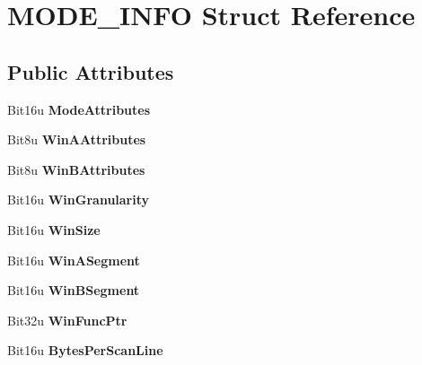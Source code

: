 \hypertarget{structMODE__INFO}{\section{M\-O\-D\-E\-\_\-\-I\-N\-F\-O Struct Reference}
\label{structMODE__INFO}
}
\subsection*{Public Attributes}
\begin{DoxyCompactItemize}
\item 
\hypertarget{structMODE__INFO_a790441499101e753e690fcbfcd8b0b68}{Bit16u {\bfseries Mode\-Attributes}}\label{structMODE__INFO_a790441499101e753e690fcbfcd8b0b68}

\item 
\hypertarget{structMODE__INFO_a9e5e8f64d10610af4f8db7b002f6ca5b}{Bit8u {\bfseries Win\-A\-Attributes}}\label{structMODE__INFO_a9e5e8f64d10610af4f8db7b002f6ca5b}

\item 
\hypertarget{structMODE__INFO_adc6e6d1278846816cf2bb928b3f49e8a}{Bit8u {\bfseries Win\-B\-Attributes}}\label{structMODE__INFO_adc6e6d1278846816cf2bb928b3f49e8a}

\item 
\hypertarget{structMODE__INFO_abde2f0dfa7ae53a81904797d80258680}{Bit16u {\bfseries Win\-Granularity}}\label{structMODE__INFO_abde2f0dfa7ae53a81904797d80258680}

\item 
\hypertarget{structMODE__INFO_ace9e0d7747d0f0e4b9144af30b928681}{Bit16u {\bfseries Win\-Size}}\label{structMODE__INFO_ace9e0d7747d0f0e4b9144af30b928681}

\item 
\hypertarget{structMODE__INFO_aae3bdd58243b1f71603973c8b4dc6da5}{Bit16u {\bfseries Win\-A\-Segment}}\label{structMODE__INFO_aae3bdd58243b1f71603973c8b4dc6da5}

\item 
\hypertarget{structMODE__INFO_a432ca8ddda41d5ac2a2a0aa2181269ea}{Bit16u {\bfseries Win\-B\-Segment}}\label{structMODE__INFO_a432ca8ddda41d5ac2a2a0aa2181269ea}

\item 
\hypertarget{structMODE__INFO_aa10faf9bf7a077a1ebbb76a1dc21159f}{Bit32u {\bfseries Win\-Func\-Ptr}}\label{structMODE__INFO_aa10faf9bf7a077a1ebbb76a1dc21159f}

\item 
\hypertarget{structMODE__INFO_a1234ba353c2dff811c8a3798de683260}{Bit16u {\bfseries Bytes\-Per\-Scan\-Line}}\label{structMODE__INFO_a1234ba353c2dff811c8a3798de683260}


\end{DoxyCompactItemize}

